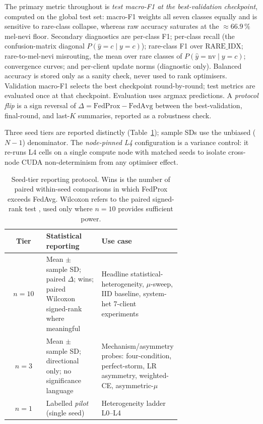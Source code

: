 \documentclass[11pt,a4paper]{report}
\begin{document}
The primary metric throughout is \emph{test macro-F1 at the best-validation
checkpoint}, computed on the global test set: macro-F1 weights all seven classes
equally and is sensitive to rare-class collapse, whereas raw accuracy saturates at
the $\approx 66.9\,\%$ mel-nevi floor. Secondary diagnostics are per-class F1;
per-class recall (the confusion-matrix diagonal $P(\hat{y} = c \mid y = c)$);
rare-class F1 over $\mathrm{RARE\_IDX}$; rare-to-mel-nevi misrouting, the mean over
rare classes of $P(\hat{y} = \text{nv} \mid y = c)$; convergence curves; and
per-client update norms (diagnostic only). Balanced accuracy is stored only as a
sanity check, never used to rank optimisers. Validation macro-F1 selects the best
checkpoint round-by-round; test metrics are evaluated once at that checkpoint.
Evaluation uses argmax predictions. A
\emph{protocol flip} is a sign reversal of $\Delta = \mathrm{FedProx} -
\mathrm{FedAvg}$ between the best-validation, final-round, and last-$K$ summaries,
reported as a robustness check.

Three seed tiers are reported distinctly (Table~\ref{tab:seed-tiers}); sample SDs
use the unbiased ($N-1$) denominator. The \emph{node-pinned L4} configuration is a variance control: it re-runs L4 cells
on a single compute node with matched seeds to isolate cross-node CUDA
non-determinism from any optimiser effect.

\begin{table}[H]
\centering
\small
\caption{Seed-tier reporting protocol. Wins is the number of paired
within-seed comparisons in which FedProx exceeds FedAvg. Wilcoxon refers
to the paired signed-rank test \citep{demsar2006classifier}, used only where
$n = 10$ provides sufficient power.}
\label{tab:seed-tiers}
\begin{tabular}{c p{0.32\linewidth} p{0.36\linewidth}}
\toprule
Tier         & Statistical reporting                                                                            & Use case                                                                                                  \\
\midrule
$n = 10$     & Mean $\pm$ sample SD; paired $\Delta$; wins; paired Wilcoxon signed-rank where meaningful        & Headline statistical-heterogeneity, $\mu$-sweep, IID baseline, system-het 7-client experiments            \\
$n = 3$      & Mean $\pm$ sample SD; directional only; no significance language                                & Mechanism/asymmetry probes: four-condition, perfect-storm, LR asymmetry, weighted-CE, asymmetric-$\mu$    \\
$n = 1$      & Labelled \emph{pilot} (single seed)                                            & Heterogeneity ladder L0--L4                                        \\
\bottomrule
\end{tabular}
\end{table}
\end{document}
